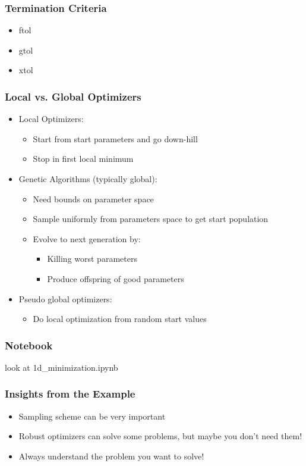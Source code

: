 \documentclass[11pt]{beamer}
\begin{document}
\begin{frame}[c]\frametitle{Termination Criteria}
    \begin{itemize}
        \item ftol
        \item gtol
        \item xtol
    \end{itemize}
\end{frame}


\begin{frame}[c]\frametitle{Local vs. Global Optimizers}
    \begin{itemize}
        \item Local Optimizers:
        \begin{itemize}
            \item Start from start parameters and go down-hill
            \item Stop in first local minimum
        \end{itemize}
        \item Genetic Algorithms (typically global):
        \begin{itemize}
            \item Need bounds on parameter space
            \item Sample uniformly from parameters space to get start population
            \item Evolve to next generation by:
            \begin{itemize}
                 \item Killing worst parameters
                 \item Produce offspring of good parameters
            \end{itemize}
        \end{itemize}
        \item Pseudo global optimizers:
        \begin{itemize}
            \item Do local optimization from random start values
        \end{itemize}
    \end{itemize}
\end{frame}



\begin{frame}[c]\frametitle{Notebook}
    look at 1d\_minimization.ipynb
\end{frame}


\begin{frame}[c]\frametitle{Insights from the Example}

    \begin{itemize}
        \item Sampling scheme can be very important
        \item Robust optimizers can solve some problems, but maybe you don't need them!
        \item Always understand the problem you want to solve!
    \end{itemize}
\end{frame}
\end{document}
